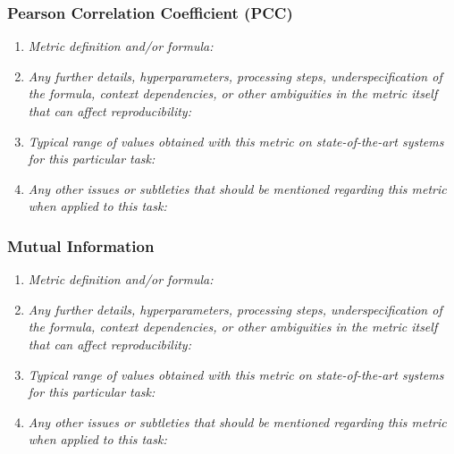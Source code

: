 \documentclass[a4paper,11pt]{article}
\begin{document}
        \subsubsection{Pearson Correlation Coefficient (PCC)}
            \begin{enumerate}[label=\alph*.]
                \item \textit{Metric definition and/or formula:}
                \bigskip
                \item \textit{Any further details, hyperparameters, processing steps, underspecification of the formula, context dependencies, or other ambiguities in the metric itself that can affect reproducibility:}
                \bigskip
                \item \textit{Typical range of values obtained with this metric on state-of-the-art systems for this particular task:}
                \bigskip
                \item \textit{Any other issues or subtleties that should be mentioned regarding this metric when applied to this task:}
                \bigskip
            \end{enumerate}
        \subsubsection{Mutual Information}
            \begin{enumerate}[label=\alph*.]
                \item \textit{Metric definition and/or formula:}
                \bigskip
                \item \textit{Any further details, hyperparameters, processing steps, underspecification of the formula, context dependencies, or other ambiguities in the metric itself that can affect reproducibility:}
                \bigskip
                \item \textit{Typical range of values obtained with this metric on state-of-the-art systems for this particular task:}
                \bigskip
                \item \textit{Any other issues or subtleties that should be mentioned regarding this metric when applied to this task:}
                \bigskip
            \end{enumerate}
\end{document}
